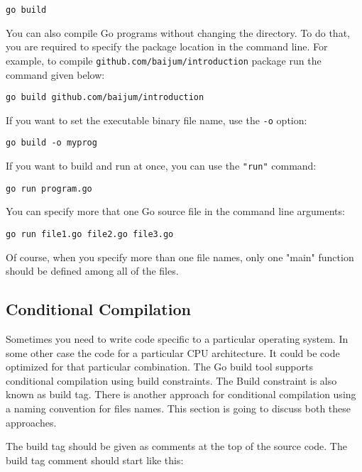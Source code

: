 \begin{lstlisting}[numbers=none]
go build
\end{lstlisting}

You can also compile Go programs without changing the directory.  To
do that, you are required to specify the package location in the
command line.  For example, to
compile \texttt{github.com/baijum/introduction} package run the
command given below:

\begin{lstlisting}[numbers=none]
go build github.com/baijum/introduction
\end{lstlisting}

If you want to set the executable binary file name, use
the \texttt{-o} option:

\begin{lstlisting}[numbers=none]
go build -o myprog
\end{lstlisting}

If you want to build and run at once, you can use the \texttt{"run"}
command:

\begin{lstlisting}[numbers=none]
go run program.go
\end{lstlisting}

You can specify more that one Go source file in the command line
arguments:

\begin{lstlisting}[numbers=none]
go run file1.go file2.go file3.go
\end{lstlisting}

Of course, when you specify more than one file names, only one "main"
function should be defined among all of the files.

\subsection{Conditional Compilation}

Sometimes you need to write code specific to a particular operating
system.  In some other case the code for a particular CPU
architecture.  It could be code optimized for that particular
combination.  The Go build tool supports conditional compilation using
build constraints.  The Build constraint is also known as build tag.
There is another approach for conditional compilation using a naming
convention for files names.  This section is going to discuss both
these approaches.

The build tag should be given as comments at the top of the source
code.  The build tag comment should start like this:

